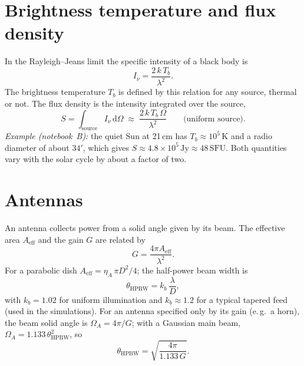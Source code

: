 
\section{Brightness temperature and flux density}

In the Rayleigh--Jeans limit the specific intensity of a black body is
\begin{equation}
  I_\nu = \frac{2\,k\,T_b}{\lambda^2} .
\end{equation}
The brightness temperature $T_b$ is defined by this relation for any
source, thermal or not. The flux density is the intensity integrated
over the source,
\begin{equation}
  S = \int_{\mathrm{source}} I_\nu\,\mathrm{d}\Omega
    \;\approx\; \frac{2\,k\,T_b\,\Omega}{\lambda^2}
  \qquad\text{(uniform source).}
  \label{eq:flux-tb}
\end{equation}
\emph{Example (notebook~B):} the quiet Sun at 21\,cm has
$T_b \approx 10^5\,\mathrm{K}$ and a radio diameter of about $34'$, which
gives $S \approx 4.8\times10^5\,\mathrm{Jy} \approx 48\,\mathrm{SFU}$.
Both quantities vary with the solar cycle by about a factor of two.

\section{Antennas}

An antenna collects power from a solid angle given by its beam. The
effective area $A_{\mathrm{eff}}$ and the gain $G$ are related by
\begin{equation}
  G = \frac{4\pi A_{\mathrm{eff}}}{\lambda^2}.
  \label{eq:gain-area}
\end{equation}
For a parabolic dish $A_{\mathrm{eff}} = \eta_A\,\pi D^2/4$; the
half-power beam width is
\begin{equation}
  \theta_{\mathrm{HPBW}} = k_b\,\frac{\lambda}{D},
\end{equation}
with $k_b = 1.02$ for uniform illumination and $k_b \approx 1.2$ for a
typical tapered feed (used in the simulations). For an antenna specified
only by its gain (e.\,g.\ a horn), the beam solid angle is
$\Omega_A = 4\pi/G$; with a Gaussian main beam,
$\Omega_A = 1.133\,\theta_{\mathrm{HPBW}}^2$, so
\begin{equation}
  \theta_{\mathrm{HPBW}} = \sqrt{\frac{4\pi}{1.133\,G}} .
\end{equation}

